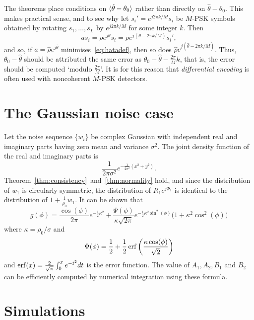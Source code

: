 \documentclass{article}
\begin{document}
The theorems place conditions on $\langle \hat{\theta} - \theta_0 \rangle$ rather than directly on $\hat{\theta} - \theta_0$.  This makes practical sense, and to see why let $s_i' = e^{j2\pi k/M}s_i$ be $M$-PSK symbols obtained by rotating $s_1, \dots, s_L$ by $e^{j2\pi k/M}$ for some integer $k$.  Then
\[
a s_i =  \rho e^{j\theta}s_i = \rho e^{j(\theta - 2\pi k/M)} s_i',
\]
and so, if $a = \hat{\rho}e^{j\hat{\theta}}$ minimises~\eqref{eq:hatadef}, then so does $\hat{\rho} e^{j(\hat{\theta} - 2\pi k/M)}$.  Thus, $\theta_0 - \hat{\theta}$ should be attributed the same error as $\theta_0 - \hat{\theta} - \tfrac{2\pi}{M}k$, that is, the error should be computed `modulo $\tfrac{2\pi}{M}$'.  It is for this reason that \emph{differential encoding} is often used with noncoherent $M$-PSK  detectors. 


\section{The Gaussian noise case}\label{sec:gaussian-noise-case}

Let the noise sequence $\{w_i\}$ be complex Gaussian with independent real and imaginary parts having zero mean and variance $\sigma^2$.  The joint density function of the real and imaginary parts is
\[
\frac{1}{2\pi\sigma^2}e^{-\frac{1}{2\sigma^2}(x^2 + y^2)}.
\]
Theorem~\ref{thm:consistency}~and~\ref{thm:normality} hold, and since the distribution of $w_1$ is circularly symmetric, the distribution of $R_1e^{j\Phi_1}$ is identical to the distribution of $1 + \frac{1}{\rho_0} w_1$.
It can be shown that
\[
g(\phi) = \frac{\cos(\phi)}{2\pi}e^{-\frac{1}{2}\kappa^2} + \frac{\Psi(\phi)}{\kappa\sqrt{2\pi}}  e^{-\frac{1}{2}\kappa^2\sin^2(\phi)} \big(1 + \kappa^2\cos^2(\phi) \big)
\]
where $\kappa = \rho_0/\sigma$ and
\[
\Psi(\phi) = \frac{1}{2} + \frac{1}{2} \operatorname{erf}\left(\frac{\kappa \cos(\phi)}{\sqrt{2}}\right)
\]
and $\operatorname{erf}(x) = \frac{2}{\sqrt{\pi}}\int_0^{x} e^{-t^2} dt$ is the error function.  The value of $A_1, A_2, B_1$ and $B_2$ can be efficiently computed by numerical integration using these formula.


\section{Simulations}\label{sec:simulations}
\end{document}
